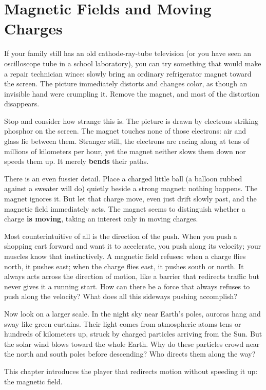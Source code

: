 \chapter{Magnetic Fields and Moving Charges}


\begin{mainline}
If your family still has an old cathode-ray-tube television (or you have seen an oscilloscope tube in a school laboratory), you can try something that would make a repair technician wince: slowly bring an ordinary refrigerator magnet toward the screen. The picture immediately distorts and changes color, as though an invisible hand were crumpling it. Remove the magnet, and most of the distortion disappears.

Stop and consider how strange this is. The picture is drawn by electrons striking phosphor on the screen. The magnet touches none of those electrons: air and glass lie between them. Stranger still, the electrons are racing along at tens of millions of kilometers per hour, yet the magnet neither slows them down nor speeds them up. It merely \textbf{bends} their paths.

There is an even fussier detail. Place a charged little ball (a balloon rubbed against a sweater will do) quietly beside a strong magnet: nothing happens. The magnet ignores it. But let that charge move, even just drift slowly past, and the magnetic field immediately acts. The magnet seems to distinguish whether a charge \textbf{is moving}, taking an interest only in moving charges.

Most counterintuitive of all is the direction of the push. When you push a shopping cart forward and want it to accelerate, you push along its velocity; your muscles know that instinctively. A magnetic field refuses: when a charge flies north, it pushes east; when the charge flies east, it pushes south or north. It always acts across the direction of motion, like a barrier that redirects traffic but never gives it a running start. How can there be a force that always refuses to push along the velocity? What does all this sideways pushing accomplish?

Now look on a larger scale. In the night sky near Earth's poles, auroras hang and sway like green curtains. Their light comes from atmospheric atoms tens or hundreds of kilometers up, struck by charged particles arriving from the Sun. But the solar wind blows toward the whole Earth. Why do these particles crowd near the north and south poles before descending? Who directs them along the way?

This chapter introduces the player that redirects motion without speeding it up: the magnetic field.
\end{mainline}

